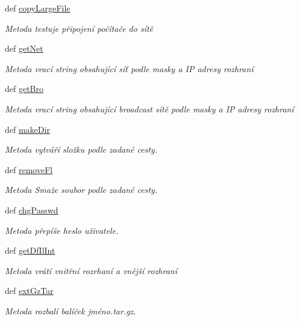 \begin{DoxyCompactItemize}
def \hyperlink{classConsSys_1_1ConsSys_a32297a919cf09725c56828a6769cff70}{copy\-Large\-File}
\begin{DoxyCompactList}\small\item\em Metoda testuje připojení počítače do sítě \end{DoxyCompactList}\item 
def \hyperlink{classConsSys_1_1ConsSys_ac263a75aea172529aaab896910868f8b}{get\-Net}
\begin{DoxyCompactList}\small\item\em Metoda vrací string obsahující síť podle masky a I\-P adresy rozhraní \end{DoxyCompactList}\item 
def \hyperlink{classConsSys_1_1ConsSys_a93f04ba291edd339f34874dacb13fa9e}{get\-Bro}
\begin{DoxyCompactList}\small\item\em Metoda vrací string obsahující broadcast sítě podle masky a I\-P adresy rozhraní \end{DoxyCompactList}\item 
def \hyperlink{classConsSys_1_1ConsSys_a5cce3cec792a5c429af36432c8dc5110}{make\-Dir}
\begin{DoxyCompactList}\small\item\em Metoda vytváří složku podle zadané cesty. \end{DoxyCompactList}\item 
def \hyperlink{classConsSys_1_1ConsSys_ace43e4206f73305e9137e0d36d00c435}{remove\-Fl}
\begin{DoxyCompactList}\small\item\em Metoda Smaže soubor podle zadané cesty. \end{DoxyCompactList}\item 
def \hyperlink{classConsSys_1_1ConsSys_acf615435122450524b7318d58c47e783}{chg\-Passwd}
\begin{DoxyCompactList}\small\item\em Metoda přepíše heslo uživatele. \end{DoxyCompactList}\item 
def \hyperlink{classConsSys_1_1ConsSys_ae4a40c5b960925adc2263425da8e7288}{get\-Df\-Il\-Int}
\begin{DoxyCompactList}\small\item\em Metoda vrátí vnitřní rozrhaní a vnější rozhraní \end{DoxyCompactList}\item 
def \hyperlink{classConsSys_1_1ConsSys_a861dc7c2e3d85558967389ce0ded55f4}{ext\-Gz\-Tar}
\begin{DoxyCompactList}\small\item\em Metoda rozbalí balíček jméno.\-tar.\-gz. \end{DoxyCompactList}\end{DoxyCompactItemize}


